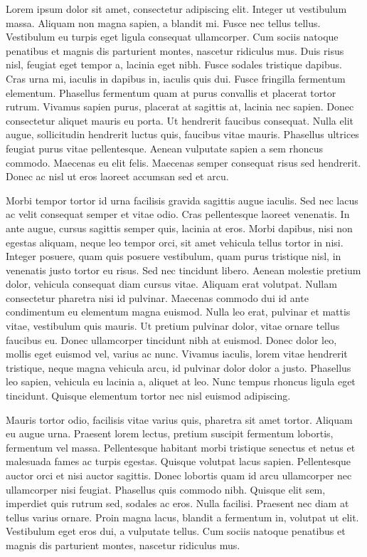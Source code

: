 \cleardoublepage
\thispagestyle{empty}

Lorem ipsum dolor sit amet, consectetur adipiscing elit. Integer ut vestibulum
massa. Aliquam non magna sapien, a blandit mi. Fusce nec tellus tellus.
Vestibulum eu turpis eget ligula consequat ullamcorper. Cum sociis natoque
penatibus et magnis dis parturient montes, nascetur ridiculus mus. Duis risus
nisl, feugiat eget tempor a, lacinia eget nibh. Fusce sodales tristique
dapibus. Cras urna mi, iaculis in dapibus in, iaculis quis dui. Fusce
fringilla fermentum elementum. Phasellus fermentum quam at purus convallis et
placerat tortor rutrum. Vivamus sapien purus, placerat at sagittis at, lacinia
nec sapien. Donec consectetur aliquet mauris eu porta. Ut hendrerit faucibus
consequat. Nulla elit augue, sollicitudin hendrerit luctus quis, faucibus
vitae mauris. Phasellus ultrices feugiat purus vitae pellentesque. Aenean
vulputate sapien a sem rhoncus commodo. Maecenas eu elit felis. Maecenas
semper consequat risus sed hendrerit. Donec ac nisl ut eros laoreet accumsan
sed et arcu.

Morbi tempor tortor id urna facilisis gravida sagittis augue iaculis. Sed nec
lacus ac velit consequat semper et vitae odio. Cras pellentesque laoreet
venenatis. In ante augue, cursus sagittis semper quis, lacinia at eros. Morbi
dapibus, nisi non egestas aliquam, neque leo tempor orci, sit amet vehicula
tellus tortor in nisi. Integer posuere, quam quis posuere vestibulum, quam
purus tristique nisl, in venenatis justo tortor eu risus. Sed nec tincidunt
libero. Aenean molestie pretium dolor, vehicula consequat diam cursus vitae.
Aliquam erat volutpat. Nullam consectetur pharetra nisi id pulvinar. Maecenas
commodo dui id ante condimentum eu elementum magna euismod. Nulla leo erat,
pulvinar et mattis vitae, vestibulum quis mauris. Ut pretium pulvinar dolor,
vitae ornare tellus faucibus eu. Donec ullamcorper tincidunt nibh at euismod.
Donec dolor leo, mollis eget euismod vel, varius ac nunc. Vivamus iaculis,
lorem vitae hendrerit tristique, neque magna vehicula arcu, id pulvinar dolor
dolor a justo. Phasellus leo sapien, vehicula eu lacinia a, aliquet at leo.
Nunc tempus rhoncus ligula eget tincidunt. Quisque elementum tortor nec nisl
euismod adipiscing.

Mauris tortor odio, facilisis vitae varius quis, pharetra sit amet tortor.
Aliquam eu augue urna. Praesent lorem lectus, pretium suscipit fermentum
lobortis, fermentum vel massa. Pellentesque habitant morbi tristique senectus
et netus et malesuada fames ac turpis egestas. Quisque volutpat lacus sapien.
Pellentesque auctor orci et nisi auctor sagittis. Donec lobortis quam id arcu
ullamcorper nec ullamcorper nisi feugiat. Phasellus quis commodo nibh. Quisque
elit sem, imperdiet quis rutrum sed, sodales ac eros. Nulla facilisi. Praesent
nec diam at tellus varius ornare. Proin magna lacus, blandit a fermentum in,
volutpat ut elit. Vestibulum eget eros dui, a vulputate tellus. Cum sociis
natoque penatibus et magnis dis parturient montes, nascetur ridiculus mus.
